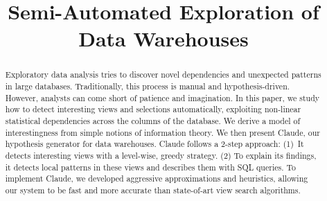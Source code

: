 \documentclass{sig-alternate}
\begin{document}
\title{Semi-Automated Exploration of Data Warehouses}



\maketitle

\begin{abstract}
Exploratory data analysis tries to discover novel dependencies and unexpected
patterns in large databases. Traditionally, this process is manual and
hypothesis-driven. However, analysts can come short of patience and
imagination. In this paper, we study how to detect interesting views and
selections automatically, exploiting non-linear statistical dependencies across
the columns of the database. We derive a model of interestingness from simple
notions of information theory. We then present Claude, our hypothesis generator
for data warehouses. Claude follows a 2-step approach: (1)~It detects
interesting views with a level-wise, greedy strategy.  (2) To explain its
findings, it detects local patterns in these views and describes them with SQL
queries.  To implement Claude, we developed aggressive approximations and
heuristics, allowing our system to be fast and more accurate than state-of-art
view search algorithms. 
\end{abstract}




\balancecolumns
\end{document}
